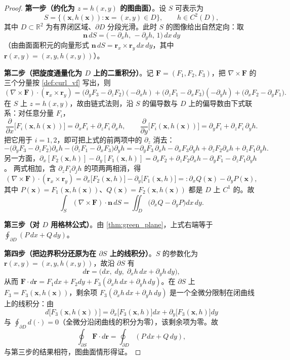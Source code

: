\begin{proof}
\textbf{第一步（约化为 $z=h(x,y)$ 的图曲面）}。设 $S$ 可表示为
\[
S = \{(\mathbf x, h(\mathbf x)) : \mathbf x=(x,y)\in D\},\qquad h\in C^2(D),
\]
其中 $D\subset\mathbb R^2$ 为有界闭区域、$\partial D$ 分段光滑。此时 $S$ 的图像给出自然定向：取
\[
\mathbf n\,dS = \bigl(-\partial_xh,\,-\partial_yh,\,1\bigr)\,dx\,dy
\]
（由曲面面积元的向量形式 $\mathbf n\,dS=\mathbf r_x\times\mathbf r_y\,dx\,dy$，其中 $\mathbf r(x,y)=(x,y,h(x,y))$）。

\textbf{第二步（把旋度通量化为 $D$ 上的二重积分）}。记 $\mathbf F=(F_1,F_2,F_3)$，把 $\nabla\times\mathbf F$ 的三个分量按 \cref{def:curl_vf} 写出，则
\[
(\nabla\times\mathbf F)\cdot(\mathbf r_x\times\mathbf r_y)
= \bigl(\partial_yF_3-\partial_zF_2\bigr)(-\partial_xh)
+ \bigl(\partial_zF_1-\partial_xF_3\bigr)(-\partial_yh)
+ \bigl(\partial_xF_2-\partial_yF_1\bigr).
\]
在 $S$ 上 $z=h(x,y)$，故由链式法则，沿 $S$ 的偏导数与 $D$ 上的偏导数由下式联系：对任意分量 $F_i$，
\[
\frac{\partial}{\partial x}\bigl[F_i(\mathbf x,h(\mathbf x))\bigr]
= \partial_xF_i+\partial_zF_i\,\partial_xh,
\qquad
\frac{\partial}{\partial y}\bigl[F_i(\mathbf x,h(\mathbf x))\bigr]
= \partial_yF_i+\partial_zF_i\,\partial_yh .
\]
把它用于 $i=1,2$，即可把上式的前两项中的 $\partial_z$ 消去：
\[
-\bigl(\partial_yF_3-\partial_zF_2\bigr)\partial_xh-\bigl(\partial_zF_1-\partial_xF_3\bigr)\partial_yh
= -\partial_yF_3\,\partial_xh-\partial_xF_3\partial_yh+\partial_zF_2\partial_xh+\partial_zF_1\partial_yh .
\]
另一方面，$
\partial_x[F_2(\mathbf x,h)]-\partial_y[F_1(\mathbf x,h)]
= \partial_xF_2+\partial_zF_2\partial_xh-\partial_yF_1-\partial_zF_1\partial_yh $。
两式相加，含 $\partial_zF_i\partial_jh$ 的项两两相消，得
\[
(\nabla\times\mathbf F)\cdot(\mathbf r_x\times\mathbf r_y)
= \partial_x\bigl[F_2(\mathbf x,h)\bigr]-\partial_y\bigl[F_1(\mathbf x,h)\bigr]
=: \partial_x Q(\mathbf x)-\partial_y P(\mathbf x),
\]
其中 $P(\mathbf x)=F_1(\mathbf x,h(\mathbf x))$、$Q(\mathbf x)=F_2(\mathbf x,h(\mathbf x))$ 都是 $D$ 上 $C^1$ 的。故
\[
\int_S(\nabla\times\mathbf F)\cdot\mathbf n\,dS = \iint_D\bigl(\partial_xQ-\partial_yP\bigr)dx\,dy .
\]

\textbf{第三步（对 $D$ 用格林公式）}。由 \cref{thm:green_plane}，上式右端等于 $\oint_{\partial D}(P\,dx+Q\,dy)$。

\textbf{第四步（把边界积分还原为在 $\partial S$ 上的线积分）}。$S$ 的参数化为 $\mathbf r(x,y)=(x,y,h(x,y))$，故沿 $\partial S$ 有
\[
d\mathbf r = \bigl(dx,\;dy,\;\partial_xh\,dx+\partial_yh\,dy\bigr),
\]
从而 $\mathbf F\cdot d\mathbf r = F_1dx+F_2dy+F_3(\partial_xh\,dx+\partial_yh\,dy)$。在 $\partial S$ 上 $F_3=F_3(\mathbf x,h(\mathbf x))$，剩余项 $F_3(\partial_xh\,dx+\partial_yh\,dy)$ 是一个全微分限制在闭曲线上的线积分：由
\[
d\bigl[F_3(\mathbf x,h(\mathbf x))\bigr] = \partial_x\bigl[F_3(\mathbf x,h)\bigr]dx+\partial_y\bigl[F_3(\mathbf x,h)\bigr]dy
\]
与 $\oint_{\partial D}d(\cdot)=0$（全微分沿闭曲线的积分为零），该剩余项为零。故
\[
\oint_{\partial S}\mathbf F\cdot d\mathbf r = \oint_{\partial D}(P\,dx+Q\,dy),
\]
与第三步的结果相符，图曲面情形得证。


\end{proof}
